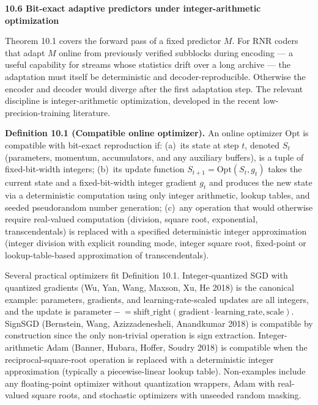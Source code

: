 \documentclass[
]{article}
\begin{document}
\textbf{10.6 Bit-exact adaptive predictors under integer-arithmetic
optimization}

Theorem 10.1 covers the forward pass of a fixed predictor $M$. For RNR
coders that adapt $M$ online from previously verified subblocks during
encoding --- a useful capability for streams whose statistics drift
over a long archive --- the adaptation must itself be deterministic
and decoder-reproducible. Otherwise the encoder and decoder would
diverge after the first adaptation step. The relevant discipline is
integer-arithmetic optimization, developed in the recent
low-precision-training literature.

\textbf{Definition 10.1 (Compatible online optimizer).} An online
optimizer $\mathrm{Opt}$ is compatible with bit-exact reproduction if:
(a)~its state at step $t$, denoted $S_t$ (parameters, momentum,
accumulators, and any auxiliary buffers), is a tuple of
fixed-bit-width integers; (b)~its update function
$S_{t+1} = \mathrm{Opt}(S_t, g_t)$ takes the current state and a
fixed-bit-width integer gradient $g_t$ and produces the new state via
a deterministic computation using only integer arithmetic, lookup
tables, and seeded pseudorandom number generation; (c)~any operation
that would otherwise require real-valued computation (division, square
root, exponential, transcendentals) is replaced with a specified
deterministic integer approximation (integer division with explicit
rounding mode, integer square root, fixed-point or lookup-table-based
approximation of transcendentals).

Several practical optimizers fit Definition 10.1. Integer-quantized
SGD with quantized gradients (Wu, Yan, Wang, Maxson, Xu, He 2018) is
the canonical example: parameters, gradients, and
learning-rate-scaled updates are all integers, and the update is
$\text{parameter} \mathrel{-}= \mathrm{shift\_right}(\text{gradient} \cdot \text{learning\_rate}, \text{scale})$.
SignSGD (Bernstein, Wang, Azizzadenesheli, Anandkumar 2018) is
compatible by construction since the only non-trivial operation is
sign extraction. Integer-arithmetic Adam (Banner, Hubara, Hoffer,
Soudry 2018) is compatible when the reciprocal-square-root operation
is replaced with a deterministic integer approximation (typically a
piecewise-linear lookup table). Non-examples include any
floating-point optimizer without quantization wrappers, Adam with
real-valued square roots, and stochastic optimizers with unseeded
random masking.
\end{document}
